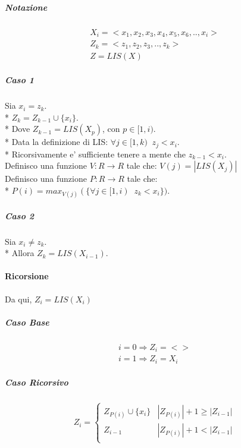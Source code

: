 \subparagraph{Notazione}

\begin{align}
    \text{$X_i = <x_1, x_2, x_3, x_4, x_5, x_6, .., x_i>$} \\
    \text{$Z_k = <z_1, z_2, z_3, .., z_k>$} \\
    \text{$Z = LIS(X)$}
\end{align}

\subparagraph{Caso 1}

Sia $x_i = z_k$. \\*
$Z_k = Z_{k-1} \cup \{x_i\}$. \\*
Dove $Z_{k-1} = LIS(X_p)$, con $p \in [1, i)$. \\*
Data la definizione di LIS: $\forall j \in [1, k) \;\; z_{j} < x_i$. \\*
Ricorsivamente e' sufficiente tenere a mente che $z_{k-1} < x_i$. \\

Definisco una funzione $V : R \rightarrow R$ tale che: $V(j) = |LIS(X_j)|$ \\

Definisco una funzione $P : R \rightarrow R$ tale che: \\*
$P(i) = max_{V(j)}(\{ \forall j \in [1, i) \;\; z_{k} < x_i \})$.

\subparagraph{Caso 2}

Sia $x_i \ne z_k$. \\*
Allora $Z_k = LIS(X_{i-1})$. \\

\paragraph{Ricorsione}

Da qui, $Z_i = LIS(X_i)$

\subparagraph{Caso Base}

\begin{align}
    \text{$i = 0 \Rightarrow Z_i = <>$} \\
    \text{$i = 1 \Rightarrow Z_i = X_i$}
\end{align}

\subparagraph{Caso Ricorsivo}

\[
    Z_i =
    \begin{cases}
        \text{$Z_{P(i)} \cup \{x_i\}$} & \text{$|Z_{P(i)}| + 1 \geq |Z_{i-1}|$} \\
        \text{$Z_{i-1}$} & \text{$|Z_{P(i)}| + 1 < |Z_{i-1}|$} \\
    \end{cases}
\]


